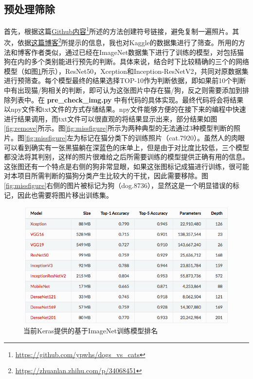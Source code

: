 \documentclass[a4paper,11pt]{article}
\begin{document}
\subsection{预处理筛除}
\label{sec:org97a1c93}
首先，根据这篇\href{https://github.com/ypwhs/dogs\_vs\_cats}{Github内容}\footnote{\url{https://github.com/ypwhs/dogs\_vs\_cats}}所述的方法创建符号链接，避免复制一遍照片。其次，依据\href{https://zhuanlan.zhihu.com/p/34068451}{这篇博客}\footnote{\url{https://zhuanlan.zhihu.com/p/34068451}}所提示的信息，我也对Kaggle的数据集进行了筛查。所用的方法和博客作者类似，通过已经在ImageNet数据集下进行了训练的模型，对包括猫狗在内的多个类别能进行预先的判断。具体来说，结合时下比较精确的三个的网络模型（如图\ref{fig:keras}所示），ResNet50，Xception和Inception-ResNetV2，共同对原数据集进行预筛查。每个模型最终的结果选择TOP-10作为判断依据，即如果前10个判断中有出现猫/狗相关的判断，即可认为这张图片中存在猫/狗，反之则需要添加到排除列表中。在 \textbf{pre\_check\_img.py} 中有代码的具体实现。最终代码将会将结果以npy文件和txt文件的方式存储结果。npy文件能够方便的在接下来的编程中快速进行结果调用，而txt文件可以很直观的将结果显示出来，部分结果如图\ref{fig:remove}所示。图\ref{fig:missfigure}所示为两种典型的无法通过3种模型判断的照片。图\ref{fig:missfigure}左为标记在猫分类下的训练照片（cat.7920）。虽然人的肉眼可以看到确实有一张黑猫躺在深蓝色的床单上，但是由于对比度比较低，三个模型都没法将其判别，这样的照片很难给之后所需要训练的模型提供正确有用的信息。这张图还有一个特点是右侧的狗非常显眼，如果这张图标记成猫进行训练，很可能对本项目所需判断的猫狗分类产生比较大的干扰，因此需要移除。图\ref{fig:missfigure}右侧的图片被标记为狗（dog.8736），显然这是一个明显错误的标记，因此也需要将图片移出训练集。

\begin{figure}[htb]
\centering
\includegraphics[scale=0.4]{./figure/keras.png}
\caption{当前Keras提供的基于ImageNet训练模型排名}
\label{fig:keras}
\end{figure}
\end{document}
